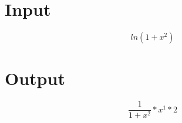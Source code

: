 \documentclass[a4paper, 12pt]{article}
\begin{document}
\Large
\section{Input}

\[ln(1 + x ^ 2 ) \]
\section{Output}

\[\frac{1 }{1 + x ^ 2 }* x ^ 1 * 2 \]
\end{document}
